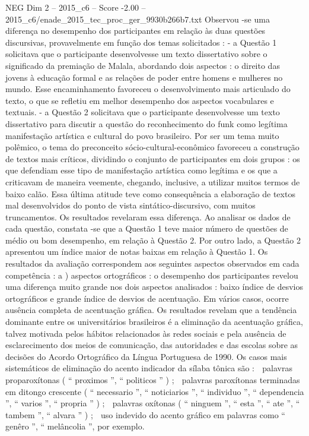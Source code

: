 \begin{textsample}{NEG Dim 2 – 2015\_c6 – Score -2.00 – 2015\_c6/enade\_2015\_tec\_proc\_ger\_9930b266b7.txt}
Observou -se uma diferença no desempenho dos participantes em relação às duas questões discursivas, provavelmente em função dos temas solicitados : - a Questão 1 solicitava que o participante desenvolvesse um texto dissertativo sobre o significado da premiação de Malala, abordando dois aspectos : o direito das jovens à educação formal e as relações de poder entre homens e mulheres no mundo.
Esse encaminhamento favoreceu o desenvolvimento mais articulado do texto, o que se refletiu em melhor desempenho dos aspectos vocabulares e textuais. - a Questão 2 solicitava que o participante desenvolvesse um texto dissertativo para discutir a questão do reconhecimento do funk como legítima manifestação artística e cultural do povo brasileiro.
Por ser um tema muito polêmico, o tema do preconceito sócio-cultural-econômico favoreceu a construção de textos mais críticos, dividindo o conjunto de participantes em dois grupos : os que defendiam esse tipo de manifestação artística como legítima e os que a criticavam de maneira veemente, chegando, inclusive, a utilizar muitos termos de baixo calão.
Essa última atitude teve como consequência a elaboração de textos mal desenvolvidos do ponto de vista sintático-discursivo, com muitos truncamentos.
Os resultados revelaram essa diferença.
Ao analisar os dados de cada questão, constata -se que a Questão 1 teve maior número de questões de médio ou bom desempenho, em relação à Questão 2.
Por outro lado, a Questão 2 apresentou um índice maior de notas baixas em relação à Questão 1.
Os resultados da avaliação correspondem aos seguintes aspectos observados em cada competência : a ) aspectos ortográficos : o desempenho dos participantes revelou uma diferença muito grande nos dois aspectos analisados : baixo índice de desvios ortográficos e grande índice de desvios de acentuação.
Em vários casos, ocorre ausência completa de acentuação gráfica.
Os resultados revelam que a tendência dominante entre os universitários brasileiros é a eliminação da acentuação gráfica, talvez motivada pelos hábitos relacionados às redes sociais e pela ausência de esclarecimento dos meios de comunicação, das autoridades e das escolas sobre as decisões do Acordo Ortográfico da Língua Portuguesa de 1990.
Os casos mais sistemáticos de eliminação do acento indicador da sílaba tônica são :  palavras proparoxítonas ( “ proximos ”, “ politicos ” ) ;  palavras paroxítonas terminadas em ditongo crescente ( “ necessario ”, “ noticiarios ”, “ individuo ”, “ dependencia ”, “ varios ”, “ propria ” ) ;  palavras oxítonas ( “ ninguem ”, “ esta ”, “ ate ”, “ tambem ”, “ alvara ” ) ;  uso indevido do acento gráfico em palavras como “ genêro ”, “ melâncolia ”, por exemplo.

\end{textsample}
